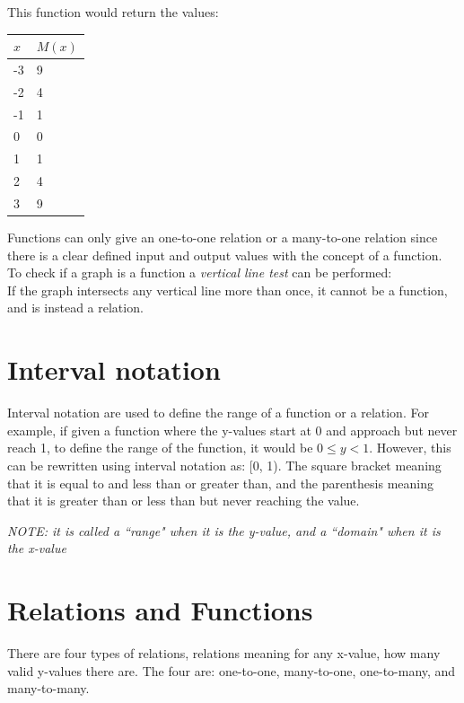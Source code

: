 \documentclass{report}
\begin{document}
This function would return the values:
\begin{center}
	\begin{tabular}{l|l}
		$x$ & $M(x)$ \\ \hline
		-3  & 9      \\
		-2  & 4      \\
		-1  & 1      \\
		0   & 0      \\
		1   & 1      \\
		2   & 4      \\
		3   & 9
	\end{tabular}
\end{center}

Functions can only give an one-to-one relation or a many-to-one relation since there is a clear defined input and output values with the concept of a function.  To check if a graph is a function a \emph{vertical line test} can be performed:\\

If the graph intersects any vertical line more than once, it cannot be a function, and is instead a relation.

\section{Interval notation}
Interval notation are used to define the range of a function or a relation.  For example, if given a function where the y-values start at 0 and approach but never reach 1, to define the range of the function, it would be $0 \leq y < 1$.  However, this can be rewritten using interval notation as: [0, 1).  The square bracket meaning that it is equal to and less than or greater than, and the parenthesis meaning that it is greater than or less than but never reaching the value.\\

\begin{center}
	\emph{NOTE:  it is called a ``range" when it is the y-value, and a ``domain" when it is the x-value}
\end{center}

\section{Relations and Functions}
There are four types of relations, relations meaning for any x-value, how many valid y-values there are.  The four are: one-to-one, many-to-one, one-to-many, and many-to-many.\\
\end{document}
